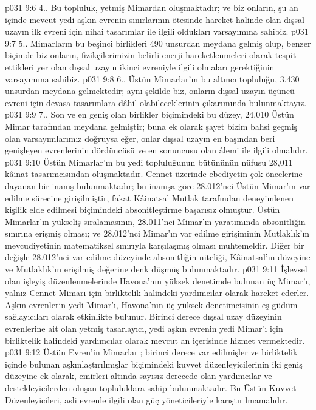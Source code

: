 \vs p031 9:6 4.\bibnobreakspace {}. Bu topluluk, yetmiş Mimardan oluşmaktadır; ve biz onların, şu an içinde mevcut yedi aşkın evrenin sınırlarının ötesinde hareket halinde olan dışsal uzayın ilk evreni için nihai tasarımlar ile ilgili oldukları varsayımına sahibiz.
\vs p031 9:7 5.\bibnobreakspace {}. Mimarların bu beşinci birlikleri 490 unsurdan meydana gelmiş olup, benzer biçimde biz onların, fizikçilerimizin belirli enerji hareketlenmeleri olarak tespit ettikleri yer olan dışsal uzayın ikinci evreniyle ilgili olmaları gerektiğinin varsayımına sahibiz.
\vs p031 9:8 6.\bibnobreakspace {}. Üstün Mimarlar’ın bu altıncı topluluğu, 3.430 unsurdan meydana gelmektedir; aynı şekilde biz, onların dışsal uzayın üçüncü evreni için devasa tasarımlara dâhil olabileceklerinin çıkarımında bulunmaktayız.
\vs p031 9:9 7.\bibnobreakspace {}. Son ve en geniş olan birlikler biçimindeki bu düzey, 24.010 Üstün Mimar tarafından meydana gelmiştir; buna ek olarak şayet bizim bahsi geçmiş olan varsayımlarımız doğruysa eğer, onlar dışsal uzayın en başından beri genişleyen evrenlerinin dördüncüsü ve en sonuncusu olan âlemi ile ilgili olmalıdır.
\vs p031 9:10 Üstün Mimarlar’ın bu yedi topluluğunun bütününün nüfusu 28,011 kâinat tasarımcısından oluşmaktadır. Cennet üzerinde ebediyetin çok öncelerine dayanan bir inanış bulunmaktadır; bu inanışa göre 28.012’nci Üstün Mimar’ın var edilme sürecine girişilmiştir, fakat Kâinatsal Mutlak tarafından deneyimlenen kişilik elde edilmesi biçimindeki absonitleştirme başarısız olmuştur. Üstün Mimarlar’ın yükseliş sıralamasının, 28.011’nci Mimar’ın yaratımında absonitliğin sınırına erişmiş olması; ve 28.012’nci Mimar’ın var edilme girişiminin Mutlaklık’ın mevcudiyetinin matematiksel sınırıyla karşılaşmış olması muhtemeldir. Diğer bir değişle 28.012’nci var edilme düzeyinde absonitliğin niteliği, Kâinatsal’ın düzeyine ve Mutlaklık’ın erişilmiş değerine denk düşmüş bulunmaktadır.
\vs p031 9:11 İşlevsel olan işleyiş düzenlenmelerinde Havona’nın yüksek denetimde bulunan üç Mimar’ı, yalnız Cennet Mimarı için birliktelik halindeki yardımcılar olarak hareket ederler. Aşkın evrenlerin yedi Mimar’ı, Havona’nın üç yüksek denetimcisinin eş güdüm sağlayıcıları olarak etkinlikte bulunur. Birinci derece dışsal uzay düzeyinin evrenlerine ait olan yetmiş tasarlayıcı, yedi aşkın evrenin yedi Mimar’ı için birliktelik halindeki yardımcılar olarak mevcut an içerisinde hizmet vermektedir.
\vs p031 9:12 Üstün Evren’in Mimarları; birinci derece var edilmişler ve birliktelik içinde bulunan aşkınlaştırılmışlar biçimindeki kuvvet düzenleyicilerinin iki geniş düzeyine ek olarak, emirleri altında sayısız derecede olan yardımcılar ve destekleyicilerden oluşan topluluklara sahip bulunmaktadır. Bu Üstün Kuvvet Düzenleyicileri, asli evrenle ilgili olan güç yöneticileriyle karıştırılmamalıdır.
